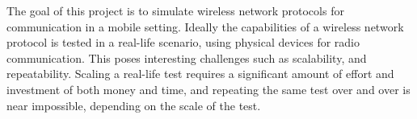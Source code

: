 

The goal of this project is to simulate wireless network protocols for communication in a mobile setting. Ideally the capabilities of a wireless network protocol is tested in a real-life scenario, using physical devices for radio communication. This poses interesting challenges such as scalability, and repeatability. Scaling a real-life test requires a significant amount of effort and investment of both money and time, and repeating the same test over and over is near impossible, depending on the scale of the test. 


\smallbreak






